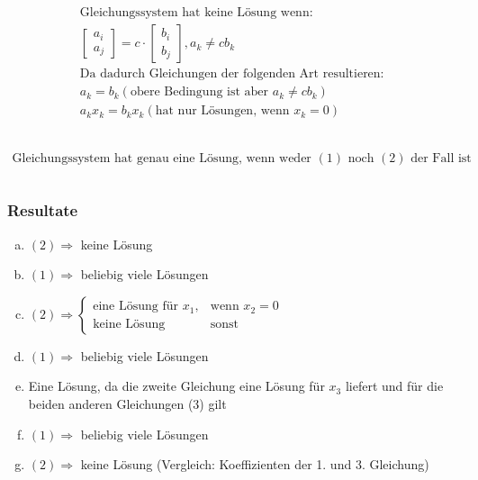 \documentclass{article}
\begin{document}
    \begin{equation}
        \begin{gathered}
            \\
            \text{Gleichungssystem hat keine Lösung wenn: } \\
            \begin{bmatrix} a_i \\ a_j \end{bmatrix}
            = c \cdot \begin{bmatrix} b_i \\ b_j \end{bmatrix}, 
            a_k \neq cb_k \\
            \text{Da dadurch Gleichungen der folgenden Art resultieren: } \\
            a_k = b_k (\text{obere Bedingung ist aber }  a_k \neq cb_k) \\
            a_k x_k = b_k x_k (\text{hat nur Lösungen, wenn } x_k=0)\\
            \\
        \end{gathered}
    \end{equation}

    \begin{equation}
        \begin{gathered}
            \\
            \text{Gleichungssystem hat genau eine Lösung, wenn weder } (1) \text{ noch } (2) \text{ der Fall ist}
            \\ \\
        \end{gathered}
    \end{equation}

    \newpage

    \subsubsection{Resultate}

    \begin{enumerate}[(a)]
    \item $(2) \Rightarrow $ keine Lösung
    \item $(1) \Rightarrow $ beliebig viele Lösungen
    \item $(2) \Rightarrow \begin{cases} \text{eine Lösung für }x_1,& \text{wenn } x_2=0 \\ \text{keine Lösung }& \text{sonst} \end{cases}$ 
    \item $(1) \Rightarrow $ beliebig viele Lösungen
    \item Eine Lösung, da die zweite Gleichung eine Lösung für $x_3$ liefert und für die beiden anderen Gleichungen (3) gilt
    \item $(1) \Rightarrow $ beliebig viele Lösungen
    \item $(2) \Rightarrow $ keine Lösung (Vergleich: Koeffizienten der 1. und 3. Gleichung)
    \end{enumerate}
\end{document}
